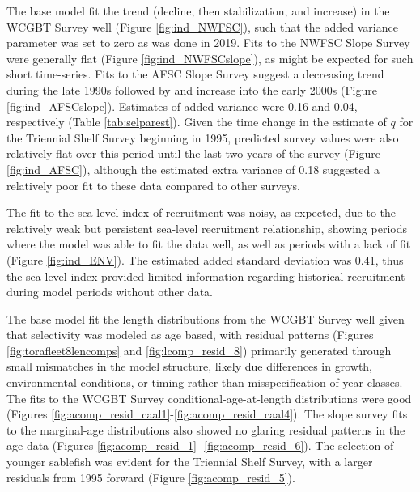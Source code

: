 \documentclass[11pt,
  english,
  a4paper,
]{article}
\begin{document}
The base model fit the trend (decline, then stabilization, and increase) in the WCGBT Survey well (Figure \ref{fig:ind_NWFSC}), such that the added variance parameter was set to zero as was done in 2019. Fits to the NWFSC Slope Survey were generally flat (Figure \ref{fig:ind_NWFSCslope}), as might be expected for such short time-series. Fits to the AFSC Slope Survey suggest a decreasing trend during the late 1990s followed by and increase into the early 2000s (Figure \ref{fig:ind_AFSCslope}). Estimates of added variance were 0.16 and 0.04, respectively (Table \ref{tab:selparest}). Given the time change in the estimate of {\(q\)\leavevmode\tagmcend\tagstructend} for the Triennial Shelf Survey beginning in 1995, predicted survey values were also relatively flat over this period until the last two years of the survey (Figure \ref{fig:ind_AFSC}), although the estimated extra variance of 0.18 suggested a relatively poor fit to these data compared to other surveys.

\leavevmode\tagmcend\tagstructend\par


The fit to the sea-level index of recruitment was noisy, as expected, due to the relatively weak but persistent sea-level recruitment relationship, showing periods where the model was able to fit the data well, as well as periods with a lack of fit (Figure \ref{fig:ind_ENV}). The estimated added standard deviation was 0.41, thus the sea-level index provided limited information regarding historical recruitment during model periods without other data.

\leavevmode\tagmcend\tagstructend\par


The base model fit the length distributions from the WCGBT Survey well given that selectivity was modeled as age based, with residual patterns (Figures \ref{fig:torafleet8lencomps} and \ref{fig:lcomp_resid_8}) primarily generated through small mismatches in the model structure, likely due differences in growth, environmental conditions, or timing rather than misspecification of year-classes. The fits to the WCGBT Survey conditional-age-at-length distributions were good (Figures \ref{fig:acomp_resid_caal1}-\ref{fig:acomp_resid_caal4}). The slope survey fits to the marginal-age distributions also showed no glaring residual patterns in the age data (Figures \ref{fig:acomp_resid_1}- \ref{fig:acomp_resid_6}). The selection of younger sablefish was evident for the Triennial Shelf Survey, with a larger residuals from 1995 forward (Figure \ref{fig:acomp_resid_5}).
\end{document}

